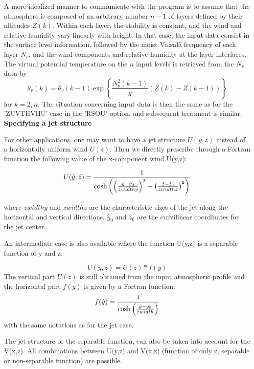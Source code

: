 A more idealized manner to communicate with the program is to assume that
the atmosphere is composed of an arbitrary number $n-1$ of layers defined
by their altitudes $Z(k)$. Within each layer,
the stability is constant, and the wind and relative humidity vary linearly
with height. In that case, the input data consist in the surface level
information, followed by the moist V\"ais\"al\"a frequency of each layer
$N_v$, and the wind components and relative humidity at the layer
interfaces.
The virtual potential temperature on the $n$ input levels is retrieved
from the $N_{v}$ data by
\begin{equation}
\theta_{v}(k)  = \theta_{v}(k-1) \exp\left\{ \dfrac{N_{v}^{2}(k-1)}{g}
\left( Z(k)-Z(k-1) \right) \right\}
\end{equation}
for $k=2,n$. The situation concerning input data is then the same as for
the 'ZUVTHVHU' case in the 'RSOU' option, and subsequent treatment is similar.\\

{\bf Specifying a jet structure}

For other applications, one may want to have a jet structure $U(y,z)$ instead
of a horizontally uniform wind $U(z)$. Then we directly prescribe through
a Fortran function the following  value of the x-component wind U(y,z):

\begin{equation}
U(\hat{y},\hat{z})= { 1 \over \cosh \left(
  \left( { \hat{y} - \hat{y}_0 \over zwidthy } \right) ^2 +
  \left( { \hat{z} - \hat{z}_0 \over zwidthz } \right) ^2
 \right) }
\end{equation}

where $ zwidthy$ and  $ zwidthz $ are the characteristic sizes of the jet along
the horizontal and vertical directions. $\hat{y}_0$ and $\hat{z}_0$ are the
curvilinear coordinates  for the jet center.

An intermediate case is also available where the function U(y,z) is a separable
function of y and z:

$$ U(y,z) = U(z) * f(y)$$
 The vertical part $ U(z)$  is still obtained from the input atmospheric profile and
the horizontal part $f(y)$ is given by a Fortran function:
\begin{equation}
 f(\hat{y}) = { 1 \over \cosh \left(
   { \hat{y} - \hat{y_0} \over zwidth } \right) }
\end{equation}
with the same notations as for the jet case.

The jet structure or the separable function, can also be taken into account for
the V(x,z). All combinations between U(y,z) and V(x,z) (function of only z,
separable or non-separable function) are possible.


